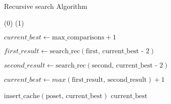 \documentclass[a4paper]{article}
\begin{document}
\begin{algorithm}
    \caption{Recursive search Algorithm}
    \begin{algorithmic}[1]

        \State \Return {}(0)
        \State \Return {}(1)
        \EndIf
        \State

        \State \Return {}
        \EndIf
        \State

        \State $current\_best \gets \text{max\_comparisons} + 1$
        \State


        \State $first\_result \gets \text{search\_rec}(\text{first, current\_best - 2})$

        \State $second\_result \gets \text{search\_rec}(\text{second, current\_best - 2})$

        \State $current\_best \gets max(\text{first\_result, second\_result}) + 1$
        \EndFor
        \State

        \State $\text{insert\_cache}(\text{poset, current\_best})$ 
        \State \Return $\text{current\_best}$
        \EndFunction
    \end{algorithmic}
\end{algorithm}
\end{document}

